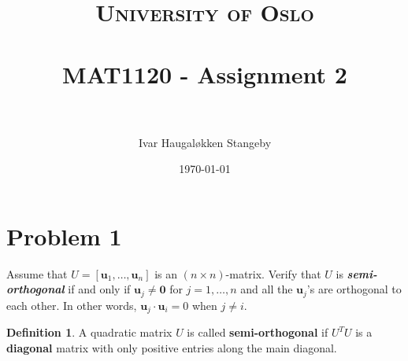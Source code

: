 \documentclass[paper=a4, fontsize=11pt]{scrartcl} %
\title{	
  \normalfont \normalsize
  \textsc{University of Oslo} \\ [25pt] %
  \horrule{0.5pt} \\[0.4cm] %
  \huge MAT1120 - Assignment 2 \\ %
  \horrule{2pt} \\[0.5cm] %
}
\author{Ivar Haugaløkken Stangeby} %
\date{\normalsize\today} %
\numberwithin{equation}{section} %
\numberwithin{figure}{section} %
\numberwithin{table}{section} %
\theoremstyle{definition}
\newtheorem*{definition}{Definition}
\begin{document}
\maketitle %
\section*{Problem 1}
Assume that $U = \left[ \mathbf{u}_1,\dots,\mathbf{u}_n \right]$ is an $\left(n \times n\right)$-matrix.
Verify that $U$ is \textbf{\textit{semi-orthogonal}} if and only if $\mathbf{u}_j \neq \mathbf{0}$ for $j=1,\dots,n$ and all the $\mathbf{u}_j$'s are orthogonal
to each other. In other words, $\mathbf{u}_j \cdot \mathbf{u}_i = 0$ when $j \neq i$.

\begin{definition}
  A quadratic matrix $U$ is called \textbf{semi-orthogonal} if $U^TU$ is a \textbf{diagonal} matrix with only positive entries along the
  main diagonal.
\end{definition}
\end{document}
